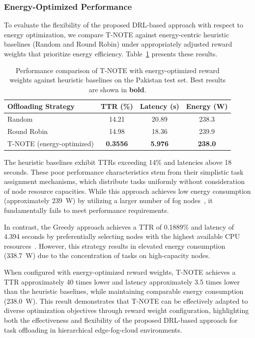 \documentclass[preprint,3p,authoryear]{elsarticle}
\begin{document}
\subsubsection{Energy-Optimized Performance}\label{sec:energy_consideration}

To evaluate the flexibility of the proposed DRL-based approach with respect to energy optimization, we compare T-NOTE against energy-centric heuristic baselines (Random and Round Robin) under appropriately adjusted reward weights that prioritize energy efficiency. Table~\ref{tab:energy_comparison} presents these results.

\begin{table}[htbp]
\centering
\begin{tabular}{lccc}
\toprule
\textbf{Offloading Strategy} & \textbf{TTR (\%)} & \textbf{Latency (s)} & \textbf{Energy (W)} \\
\midrule
Random 
 & 14.21
 & 20.89
 & 238.3 \\
Round Robin 
 & 14.98
 & 18.36
 & 239.9 \\
\midrule
T-NOTE (energy-optimized)
 & \textbf{0.3556} 
 & \textbf{5.976} 
 & \textbf{238.0} \\
\bottomrule
\end{tabular}
\caption{Performance comparison of T-NOTE with energy-optimized reward weights against heuristic baselines on the Pakistan test set. Best results are shown in \textbf{bold}.}
\label{tab:energy_comparison}
\end{table}

The heuristic baselines exhibit TTRs exceeding 14\% and latencies above 18 seconds. These poor performance characteristics stem from their simplistic task assignment mechanisms, which distribute tasks uniformly without consideration of node resource capacities. While this approach achieves low energy consumption (approximately 239~W) by utilizing a larger number of fog nodes~\cite{subsec:random}, it fundamentally fails to meet performance requirements.

In contrast, the Greedy approach achieves a TTR of 0.1889\% and latency of 4.394 seconds by preferentially selecting nodes with the highest available CPU resources~\cite{subsec:greedy-baseline}. However, this strategy results in elevated energy consumption (338.7~W) due to the concentration of tasks on high-capacity nodes.

When configured with energy-optimized reward weights, T-NOTE achieves a TTR approximately 40 times lower and latency approximately 3.5 times lower than the heuristic baselines, while maintaining comparable energy consumption (238.0~W). This result demonstrates that T-NOTE can be effectively adapted to diverse optimization objectives through reward weight configuration, highlighting both the effectiveness and flexibility of the proposed DRL-based approach for task offloading in hierarchical edge-fog-cloud environments.
\end{document}

